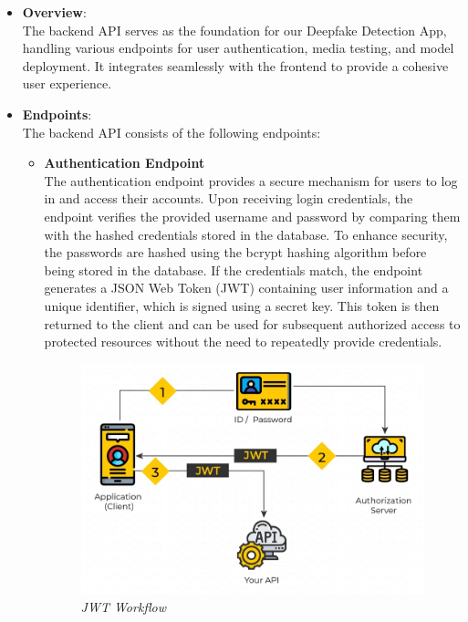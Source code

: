 \begin{itemize}
    \item \textbf{Overview}:\\
          The backend API serves as the foundation for our Deepfake Detection App, handling various endpoints for user authentication, media testing, and model deployment. It integrates seamlessly with the frontend to provide a cohesive user experience.\\

    \item \textbf{Endpoints}:\\
          The backend API consists of the following endpoints:

          \begin{itemize}

              \item \textbf{Authentication Endpoint}\\
                    The authentication endpoint provides a secure mechanism for users to log in and access their accounts. Upon receiving login credentials, the endpoint verifies the provided username and password by comparing them with the hashed credentials stored in the database. To enhance security, the passwords are hashed using the bcrypt hashing algorithm before being stored in the database. If the credentials match, the endpoint generates a JSON Web Token (JWT) containing user information and a unique identifier, which is signed using a secret key. This token is then returned to the client and can be used for subsequent authorized access to protected resources without the need to repeatedly provide credentials.\\

                    \begin{figure}[htbp]
                        \centering
                        \includegraphics[width=5in]{img/JSON-Web-Tokens-01.png}
                        \caption{\textit{JWT Workflow}}
                    \end{figure}


\end{itemize}
\end{itemize}
